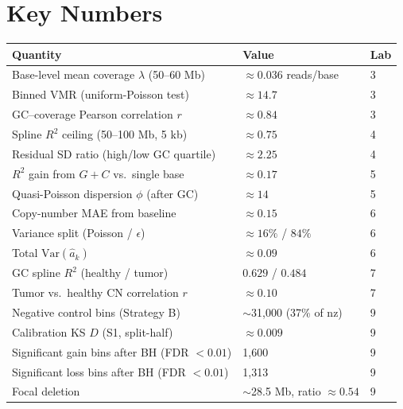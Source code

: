 \documentclass[11pt]{article}
\begin{document}
\section{Key Numbers}

\begin{center}
\begin{tabular}{@{}lll@{}}
\toprule
\textbf{Quantity} & \textbf{Value} & \textbf{Lab} \\
\midrule
Base-level mean coverage $\lambda$ (50--60 Mb) & $\approx 0.036$ reads/base & 3 \\
Binned VMR (uniform-Poisson test)              & $\approx 14.7$             & 3 \\
GC--coverage Pearson correlation $r$           & $\approx 0.84$             & 3 \\
Spline $R^2$ ceiling (50--100 Mb, 5 kb)        & $\approx 0.75$             & 4 \\
Residual SD ratio (high/low GC quartile)       & $\approx 2.25$             & 4 \\
$R^2$ gain from $G{+}C$ vs.\ single base        & $\approx 0.17$             & 5 \\
Quasi-Poisson dispersion $\phi$ (after GC)     & $\approx 14$               & 5 \\
Copy-number MAE from baseline                  & $\approx 0.15$             & 6 \\
Variance split (Poisson / $\epsilon$)          & $\approx 16\%$ / $84\%$    & 6 \\
Total $\mathrm{Var}(\hat a_k)$                  & $\approx 0.09$             & 6 \\
GC spline $R^2$ (healthy / tumor)              & $0.629$ / $0.484$          & 7 \\
Tumor vs.\ healthy CN correlation $r$          & $\approx 0.10$             & 7 \\
\midrule
Negative control bins (Strategy B)             & $\sim$31,000 (37\% of nz)  & 9 \\
Calibration KS $D$ (S1, split-half)            & $\approx 0.009$            & 9 \\
Significant gain bins after BH (FDR $<0.01$)   & 1,600                      & 9 \\
Significant loss bins after BH (FDR $<0.01$)   & 1,313                      & 9 \\
Focal deletion                                 & $\sim$28.5 Mb, ratio $\approx 0.54$ & 9 \\

\end{tabular}
\end{center}
\end{document}
